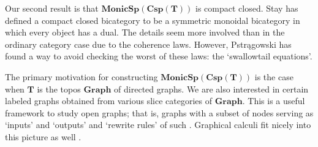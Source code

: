 \documentclass{tac}
\newcommand{\cat}[1]{\mathbf{#1}}
\newcommand{\bimonspcsp}[1]{\mathbf{MonicSp(Csp(#1))}}
\theoremstyle{remark}
\theoremstyle{definition}
\begin{document}
Our second result is that $\bimonspcsp{T}$ 
is compact closed.
Stay \cite{Stay} has defined a 
compact closed bicategory 
to be a symmetric monoidal bicategory 
in which every object has a dual. 
The details seem more involved than in the ordinary category case due to the coherence laws.  
However, Pstr\k{a}gowski \cite{Piotr} has found a way to avoid checking the worst of these laws: the `swallowtail equations'.


The primary motivation for constructing $\bimonspcsp{T}$ 
is the case when $\cat{T}$ 
is the topos $\cat{Graph}$ 
of directed graphs.
We are also interested in 
certain labeled graphs obtained
from various slice categories of 
$\cat{Graph}$.
This is a useful framework to study 
open graphs; that is, graphs with
a subset of nodes serving as `inputs' and `outputs'
and `rewrite rules' of such \cite{Cic}.
Graphical calculi fit nicely
into this picture as well \cite{Cic_zx}.
\end{document}
